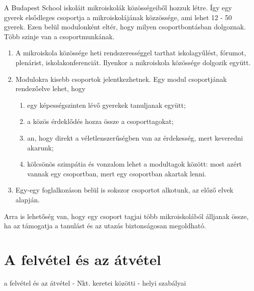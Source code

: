 A Budapest School iskoláit mikroiskolák közösségeiből hozzuk létre. Így
egy gyerek elsődleges csoportja a mikroiskolájának közzössége, ami lehet
12 - 50 gyerek. Ezen belül modulonként eltér, hogy milyen
csoportbontásban dolgoznak. Több szinje van a csoportmunkának.
\begin{enumerate}

  \item A mikroiskola közössége heti rendszerességgel tarthat iskolagyűlést,
        fórumot, plenárist, iskolakonferenciát. Ilyenkor a mikroiskola közössége
        dolgozik együtt.
  \item  Modulokra kisebb csoportok jelentkezhetnek. Egy modul
        csoportjának rendezőelve lehet, hogy
        \begin{enumerate}
          \item egy képességszinten lévő gyerekek tanuljanak együtt;
          \item a közös érdeklődés hozza össze a
                csoporttagokat;
          \item an, hogy direkt a véletlenszerűségben van az
                érdekesség, mert keveredni akarunk;
          \item kölcsönös szimpátia és vonzalom
                lehet a modultagok között: most azért vannak egy csoportban, mert egy
                csoportban akartak lenni.
        \end{enumerate}
  \item  Egy-egy foglalkozáson belül is sokszor
        csoportot alkotunk, az előző elvek alapján.

\end{enumerate}

Arra is lehetőség van, hogy egy csoport tagjai több mikroiskolából álljanak
össze, ha az támogatja a tanulást és az utazás biztonságosan megoldható.
% 



\section{A felvétel és az
  átvétel}


a felvétel és az átvétel - Nkt. keretei közötti - helyi szabályai



